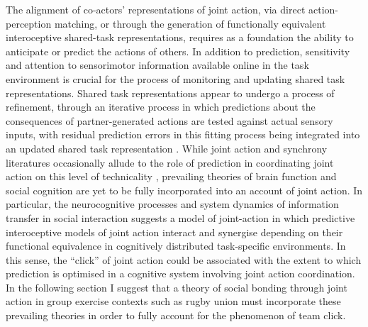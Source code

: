 \begin{CJK}{UTF8}{gbsn}
The alignment of co-actors' representations of joint action, via direct action-perception matching, or through the generation of functionally equivalent interoceptive shared-task representations, requires as a foundation the ability to anticipate or predict the actions of others.  In addition to prediction, sensitivity and attention to sensorimotor information available online in the task environment is crucial for the process of monitoring and updating shared task representations. Shared task representations appear to undergo a process of refinement, through an iterative process in which predictions about the consequences of partner-generated actions are tested against actual sensory inputs, with residual prediction errors in this fitting process being integrated into an updated shared task representation \citep{Vesper2016}. While joint action and synchrony literatures occasionally allude to the role of prediction in coordinating joint action on this level of technicality \citep[see for example][]{Sebanz2009,Glover2017}, prevailing theories of brain function and social cognition are yet to be fully incorporated into an account of joint action.  In particular, the neurocognitive processes and system dynamics of information transfer in social interaction suggests a model of joint-action in which predictive interoceptive models of joint action interact and synergise depending on their functional equivalence in cognitively distributed task-specific environments. In this sense, the ``click'' of joint action could be associated with the extent to which prediction is optimised in a cognitive system involving joint action coordination.  In the following section I suggest that a theory of social bonding through joint action in group exercise contexts such as rugby union must incorporate these prevailing theories in order to fully account for the phenomenon of team click.

\clearpage




\end{CJK}
